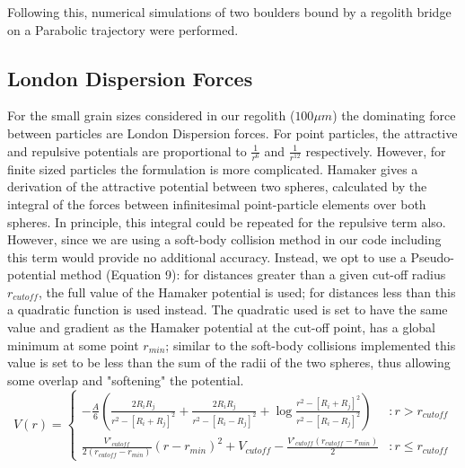 \documentclass[letterpaper, preprint, paper,11pt]{AAS}	%
\begin{document}
Following this, numerical simulations of two boulders bound by a regolith bridge on a Parabolic trajectory were performed. 


\subsection{London Dispersion Forces}

For the small grain sizes considered in our regolith ($100\mu m$) the dominating force between particles are London Dispersion forces. For point particles, the attractive and repulsive potentials are proportional to $\frac{1}{r^6}$ and $\frac{1}{r^{12}}$ respectively. However, for finite sized particles the formulation is more complicated. Hamaker gives a derivation of the attractive potential between two spheres, calculated by the integral of the forces between infinitesimal point-particle elements over both spheres. In principle, this integral could be repeated for the repulsive term also. However, since we are using a soft-body collision method in our code including this term would provide no additional accuracy. Instead, we opt to use a Pseudo-potential method (Equation 9): for distances greater than a given cut-off radius $r_{cutoff}$, the full value of the Hamaker potential is used; for distances less than this a quadratic function is used instead. The quadratic used is set to have the same value and gradient as the Hamaker potential at the cut-off point, has a global minimum at some point $r_{min}$; similar to the soft-body collisions implemented this value is set to be less than the sum of the radii of the two spheres, thus allowing some overlap and "softening" the potential. 
\begin{equation}
V(r) = \left\{
\begin{array}{lr}
-\frac{A}{6}\left(\frac{2R_iR_j}{r^2-[R_i+R_j]^2}+\frac{2R_iR_j}{r^2-[R_i-R_j]^2}+\log\frac{r^2-[R_i+R_j]^2}{r^2-[R_i-R_j]^2}\right) & : r > r_{cutoff}\\
\frac{V'_{cutoff}}{2(r_{cutoff}-r_{min})}(r-r_{min})^2+V_{cutoff} - \frac{V'_{cutoff}(r_{cutoff}-r_{min})}{2} & : r \leq r_{cutoff}
\end{array}
\right.
\end{equation}
\end{document}
